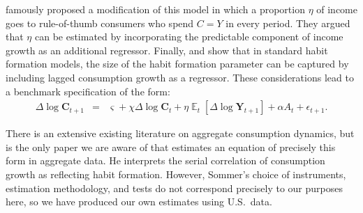 \documentclass[titlepage]{article}
\DeclareMathOperator{\Ex}{\mathbb{E}} %
\begin{document}
\cite{cmModel} famously proposed a modification of this model in which a proportion $\eta$ of income goes to rule-of-thumb consumers who spend $C=Y$ in every period.  They argued that $\eta$ can be estimated by incorporating the predictable component of income growth as an additional regressor.  Finally, \cite{dynanHabits} and \cite{som07} show that in standard habit formation models, the size of the habit formation parameter can be captured by including lagged consumption growth as a regressor.  These considerations lead to a benchmark specification of the form:
\begin{eqnarray}
  \label{eq:CGrowBench}
  \Delta \log \mathbf{C}_{t+1} & = & \varsigma+\chi \Delta \log \mathbf{C}_{t}+\eta \Ex_{t}[\Delta \log \mathbf{Y}_{t+1}]+\alpha A_{t}+\epsilon_{t+1}.
\end{eqnarray}

There is an extensive existing literature on aggregate consumption dynamics, but \cite{som07} is the only paper we are aware of that estimates an equation of precisely this form in aggregate data.  He interprets the serial correlation of consumption growth as reflecting habit formation. However, Sommer's choice of instruments, estimation methodology, and tests do not correspond precisely to our purposes here, so we have produced our own estimates using U.S.\ data.
\end{document}
